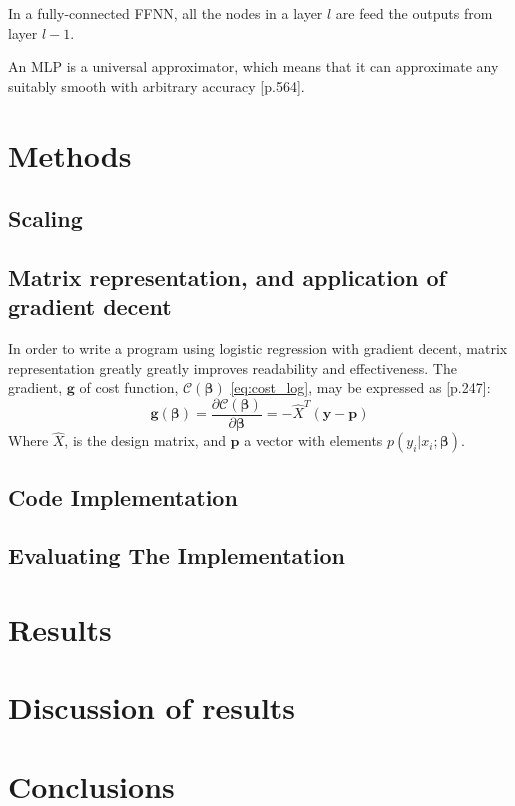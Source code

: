 \documentclass[%
oneside,                 %
final,                   %
10pt]{article}
\begin{document}
In a fully-connected FFNN, all the nodes in a layer $l$ are feed the outputs from layer $l-1$.

An MLP is a universal approximator, which means that it can approximate any suitably smooth with arbitrary accuracy \citep{MLMurphy}[p.564].



\section{Methods}\label{Section_Methods}
\subsection{Scaling} \label{Section_M_Scaling}
\subsection{Matrix representation, and application of gradient decent} \label{Section_M_Matrixrep}
In order to write a program using logistic regression with gradient decent, matrix representation greatly greatly improves readability and effectiveness. The gradient, $\bm g$ of cost function, $\mathcal{C}(\bm{\beta})$ \eqref{eq:cost_log}, may be expressed as \citep{MLMurphy}[p.247]:
\begin{equation}
\bm g (\bm \beta)= \frac{\partial \mathcal{C}(\bm{\beta})}{\partial \bm \beta}= -\hat{X}^T(\bm y-\bm p )
\end{equation}
Where $\hat{X}$, is the design matrix, and $\bm p$ a vector with elements $p(y_i|x_i;\bm \beta)$.



\subsection{Code Implementation} \label{Section_M_Codeimpl}
\subsection{Evaluating The Implementation} \label{Section_M_eval}

\section{Results} \label{Section_Results}
\section{Discussion of results} \label{Section_Discussion_of_results}
\section{Conclusions} \label{Section_Conclusions}






\begin{appendices}

\end{appendices}
\end{document}
